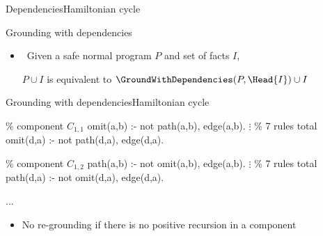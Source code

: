 \begin{frame}[shrink]{Dependencies}{Hamiltonian cycle}
  \begin{center}
    \DepGraph
  \end{center}
\end{frame}
\begin{frame}{Grounding with dependencies}
  \bigskip
  \begin{center}
  \end{center}
  \bigskip
  \begin{itemize}
    \item<2->  \ Given a safe normal program \(P\) and set of facts \(I\),

      \(P \cup I\) is equivalent to \(\GroundWithDependencies(P,\Head{I}) \cup I\)
  \end{itemize}
\end{frame}
\begin{frame}{Grounding with dependencies}{Hamiltonian cycle}
  \newcommand{\Component}[1]{\(C_{#1}\)}
  \begin{SemiVerbatim}{.9}
    {\color{comment}\% component \Component{1,1}}
    omit(a,b) :- not path(a,b), \alert{edge(a,b)}.
    \(\vdots\) {\color{comment}\% 7 rules total}
    omit(d,a) :- not path(d,a), \alert{edge(d,a)}.

    {\color{comment}\% component \Component{1,2}}
    path(a,b) :- not omit(a,b), \alert{edge(a,b)}.
    \(\vdots\) {\color{comment}\% 7 rules total}
    path(d,a) :- not omit(d,a), \alert{edge(d,a)}.

    ...
  \end{SemiVerbatim}
  \vspace{-.8cm}
  \begin{itemize}
    \item<2-> No re-grounding if there is no positive recursion in a component
  \end{itemize}
  \smallskip
\end{frame}
